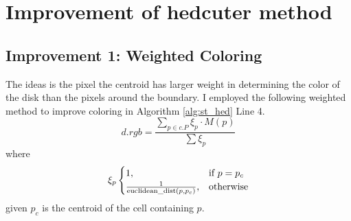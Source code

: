 \documentclass[11pt]{article}
\begin{document}
\section{Improvement of hedcuter method}

\subsection*{Improvement 1: Weighted Coloring}
The ideas is the pixel the centroid has larger weight in  determining the color of the disk than the pixels around the boundary.
I employed  the following weighted method to improve coloring in Algorithm \ref{alg:st_hed} Line 4.
$$d.rgb =\frac{\sum_{p \in c.P} {\xi_p \cdot M(p)} } {\sum{\xi_p}}$$
where 
\begin{eqnarray*}
\xi_p
\begin{cases}
1, & \text{if } p = p_c\cr 
\frac{1}{ \text{euclidean\_dist}(p,p_c)  }, & \text{otherwise} \cr
\end{cases}
\end{eqnarray*}
given $p_c$ is the centroid of the cell containing $p$.
\end{document}
